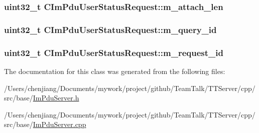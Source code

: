 \subsubsection[{m\+\_\+attach\+\_\+len}]{\setlength{\rightskip}{0pt plus 5cm}uint32\+\_\+t C\+Im\+Pdu\+User\+Status\+Request\+::m\+\_\+attach\+\_\+len\hspace{0.3cm}{\ttfamily [private]}}\label{class_c_im_pdu_user_status_request_aa4665fd928ce5b438aeafdb45ba4f08b}
\hypertarget{class_c_im_pdu_user_status_request_a1a97f606e1a7969e58a65bee951dcc15}{}
\subsubsection[{m\+\_\+query\+\_\+id}]{\setlength{\rightskip}{0pt plus 5cm}uint32\+\_\+t C\+Im\+Pdu\+User\+Status\+Request\+::m\+\_\+query\+\_\+id\hspace{0.3cm}{\ttfamily [private]}}\label{class_c_im_pdu_user_status_request_a1a97f606e1a7969e58a65bee951dcc15}
\hypertarget{class_c_im_pdu_user_status_request_aab6e7b171be08f6ca24d7674967516d4}{}
\subsubsection[{m\+\_\+request\+\_\+id}]{\setlength{\rightskip}{0pt plus 5cm}uint32\+\_\+t C\+Im\+Pdu\+User\+Status\+Request\+::m\+\_\+request\+\_\+id\hspace{0.3cm}{\ttfamily [private]}}\label{class_c_im_pdu_user_status_request_aab6e7b171be08f6ca24d7674967516d4}


The documentation for this class was generated from the following files\+:\begin{DoxyCompactItemize}
\item 
/\+Users/chenjiang/\+Documents/mywork/project/github/\+Team\+Talk/\+T\+T\+Server/cpp/src/base/\hyperlink{_im_pdu_server_8h}{Im\+Pdu\+Server.\+h}\item 
/\+Users/chenjiang/\+Documents/mywork/project/github/\+Team\+Talk/\+T\+T\+Server/cpp/src/base/\hyperlink{_im_pdu_server_8cpp}{Im\+Pdu\+Server.\+cpp}\end{DoxyCompactItemize}
